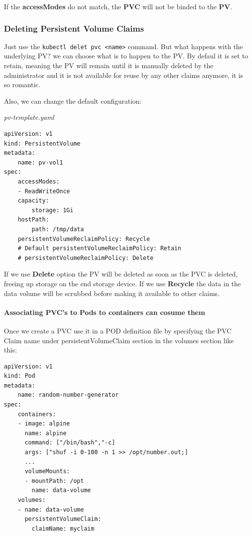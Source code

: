 \documentclass{article}
\newenvironment{blocktemplateIII}[1]{%
    \tcolorbox[beamer,%
    noparskip,breakable,
    ,colframe=Red,%
    colbacklower=LimeGreen!75!LightGreen,%
    title=#1]}%
    {\endtcolorbox}
\newenvironment{codetemplate}[1][]{%
  \mybasecolorbox[#1]
  \itshape
}{%
  \endmybasecolorbox
}
\begin{document}
\begin{blocktemplateIII}{WARNING}
If the \textbf{accessModes} do not match, the \textbf{PVC} will not be binded to the \textbf{PV}.
\end{blocktemplateIII}

\subsubsection{Deleting Persistent Volume Claims}

Just use the  \verb|kubectl delet pvc <name>| command. But what happens with the underlying PV? we can choose what is to happen to the PV. By defaul it is set to retain, meaning the PV will remain until it is manually deleted by the administrator and it is not available for reuse by any other claims anymore, it is so romantic.

Also, we can change the default configuration:

\begin{codetemplate}{pv-template.yaml}
\begin{verbatim}
apiVersion: v1
kind: PersistentVolume
metadata:
    name: pv-vol1
spec:
    accessModes:
    - ReadWriteOnce
    capacity:
        storage: 1Gi
    hostPath:
        path: /tmp/data
    persistentVolumeReclaimPolicy: Recycle
    # Default persistentVolumeReclaimPolicy: Retain
    # persistentVolumeReclaimPolicy: Delete
\end{verbatim}
\end{codetemplate}

If we use \textbf{Delete} option the PV will be deleted as soon as the PVC is deleted, freeing up storage on the end storage device. If we use \textbf{Recycle} the data in the data volume will be scrubbed before making it available to other claims.

\paragraph{Associating PVC's to Pods to containers can cosume them}

Once we create a PVC use it in a POD definition file by specifying the PVC Claim name under persistentVolumeClaim section in the volumes section like this:

\begin{codetemplate}{}
\begin{verbatim}
apiVersion: v1
kind: Pod
metadata:
    name: random-number-generator
spec:
    containers:
    - image: alpine
      name: alpine
      command: ["/bin/bash","-c]
      args: ["shuf -i 0-100 -n 1 >> /opt/number.out;]
      ...
      volumeMounts:
      - mountPath: /opt
        name: data-volume
    volumes:
    - name: data-volume
      persistentVolumeClaim:
        claimName: myclaim
\end{verbatim}
\end{codetemplate}
\end{document}
